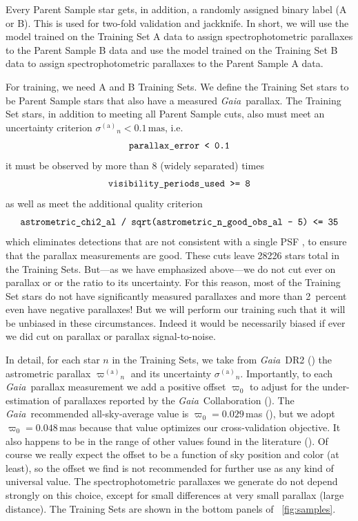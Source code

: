 \documentclass[modern]{aastex62}
\newcommand{\code}[1]{\texttt{\detokenize{#1}}}
\newcommand{\acronym}[1]{{\small{#1}}}
\newcommand{\project}[1]{\textsl{#1}}
\newcommand{\gaia}{\project{Gaia}}
\newcommand{\gparallax}{{\varpi^{(\mathrm{a})}}}
\newcommand{\gsigma}{{\sigma^{(\mathrm{a})}}}
\begin{document}
Every Parent Sample star gets, in addition, a randomly assigned binary
label (A or B).
This is used for two-fold validation and jackknife.
In short, we will
use the model trained on the Training Set A data to assign spectrophotometric parallaxes
to the Parent Sample B data and
use the model trained on the Training Set B data to assign spectrophotometric parallaxes
to the Parent Sample A data.

For training, we need A and B Training Sets.
We define the Training Set stars to be Parent Sample stars that also
have a measured \gaia\ parallax.
The Training Set stars, in addition to meeting all Parent Sample cuts,
also must meet an uncertainty criterion $\gsigma_n < 0.1\,\mathrm{mas}$, i.e. 
\begin{equation}
\code{parallax_error < 0.1}
\end{equation}
it must be observed by more than $8$ (widely separated) times
\begin{equation}
\code{visibility_periods_used >= 8}
\end{equation}
as well as meet the additional quality criterion
\begin{equation}
\code{astrometric_chi2_al / sqrt(astrometric_n_good_obs_al - 5) <= 35}
\end{equation}
which eliminates detections that are not consistent with a single PSF \citep[see][]{calj},
to ensure that the parallax measurements are good.
These cuts leave 28226 stars total in the Training Sets.
But---as we have emphasized above---we do not cut ever on parallax or
or the ratio to its uncertainty. For this reason, most of the Training Set stars
do not have significantly measured parallaxes and more than 2~percent even have
negative parallaxes!
But we will perform our training such that it will be unbiased in these
circumstances.
Indeed it would be necessarily biased if ever we did cut on parallax or
parallax signal-to-noise.

In detail,
for each star $n$ in the Training Sets, we take from \gaia\ \acronym{DR2} (\citealt{gaiadr2})
the astrometric parallax $\gparallax_n$ and its uncertainty $\gsigma_n$.
Importantly, to each \gaia\ parallax measurement we add a positive
offset $\varpi_0$ to adjust for the under-estimation of
parallaxes reported by the \gaia\ Collaboration (\citealt{lindegren}).
The \gaia\ recommended all-sky-average value is $\varpi_0=0.029$\,mas (\citealt{lindegren}),
but we adopt $\varpi_0 = 0.048$\,mas because that value
optimizes our cross-validation objective.
It also happens to be in the range of other values found in the literature (\citealt{arenou, zinn}).
Of course we really expect the offset to be a function of sky position and color (at least),
so the offset we find is not recommended for further use as any kind of universal value.
The spectrophotometric parallaxes we generate
do not depend strongly on this choice, except
for small differences at very small parallax (large distance).
The Training Sets are shown in the bottom panels of \figurename~\ref{fig:samples}.
\end{document}
